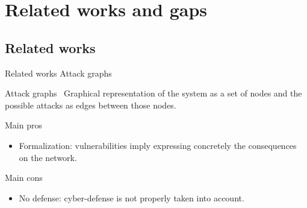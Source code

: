 \AtBeginSection[]{
	\begin{frame}
		\frametitle{}
		\tableofcontents[currentsection]
	\end{frame}
}

 
 \section{Related works and gaps}
 
	\subsection{Related works}
 
	\begin{frame}{Related works}
		{Attack graphs}

            \begin{block}{Attack graphs~\cite{CPhilips1998}}
                Graphical representation of the system as a set of nodes and the possible attacks as edges between those nodes.
            \end{block}

            \begin{prosblock}{Main pros}
                \begin{itemize}
                    \item Formalization: vulnerabilities imply expressing concretely the consequences on the network.
                \end{itemize}
            \end{prosblock}

            \begin{consblock}{Main cons}
                \begin{itemize}
                    \item No defense: cyber-defense is not properly taken into account.
                \end{itemize}
            \end{consblock}
 
	\end{frame}

